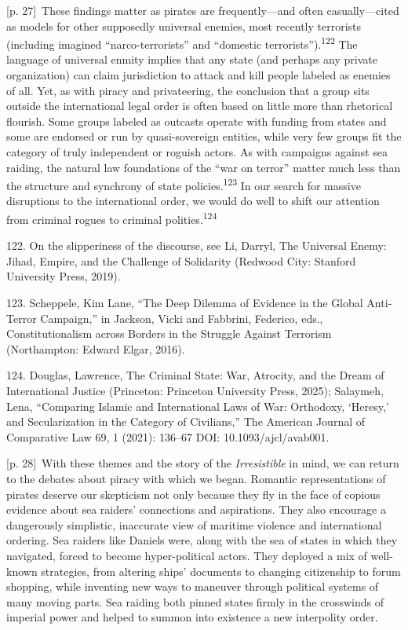 \documentclass[10pt,a4paper]{article}
\begin{document}
{\scriptsize\color{gray} [p. 27]}\ These findings matter as pirates are frequently—and often casually—cited as models for other supposedly universal enemies, most recently terrorists (including imagined “narco-terrorists” and “domestic terrorists”).\nobreak\textsuperscript{122} The language of universal enmity implies that any state (and perhaps any private organization) can claim jurisdiction to attack and kill people labeled as enemies of all. Yet, as with piracy and privateering, the conclusion that a group sits outside the international legal order is often based on little more than rhetorical flourish. Some groups labeled as outcasts operate with funding from states and some are endorsed or run by quasi-sovereign entities, while very few groups fit the category of truly independent or roguish actors. As with campaigns against sea raiding, the natural law foundations of the “war on terror” matter much less than the structure and synchrony of state policies.\nobreak\textsuperscript{123} In our search for massive disruptions to the international order, we would do well to shift our attention from criminal rogues to criminal polities.\nobreak\textsuperscript{124}\par{\small 122. On the slipperiness of the discourse, see Li, Darryl, The Universal Enemy: Jihad, Empire, and the Challenge of Solidarity (Redwood City: Stanford University Press, 2019).\par}{\small 123. Scheppele, Kim Lane, “The Deep Dilemma of Evidence in the Global Anti‐Terror Campaign,” in Jackson, Vicki and Fabbrini, Federico, eds., Constitutionalism across Borders in the Struggle Against Terrorism (Northampton: Edward Elgar, 2016).\par}{\small 124. Douglas, Lawrence, The Criminal State: War, Atrocity, and the Dream of International Justice (Princeton: Princeton University Press, 2025); Salaymeh, Lena, “Comparing Islamic and International Laws of War: Orthodoxy, ‘Heresy,’ and Secularization in the Category of Civilians,” The American Journal of Comparative Law 69, 1 (2021): 136–67 DOI: 10.1093/ajcl/avab001.\par}
{\scriptsize\color{gray} [p. 28]}\ With these themes and the story of the \textit{Irresistible} in mind, we can return to the debates about piracy with which we began. Romantic representations of pirates deserve our skepticism not only because they fly in the face of copious evidence about sea raiders’ connections and aspirations. They also encourage a dangerously simplistic, inaccurate view of maritime violence and international ordering. Sea raiders like Daniels were, along with the sea of states in which they navigated, forced to become hyper-political actors. They deployed a mix of well-known strategies, from altering ships’ documents to changing citizenship to forum shopping, while inventing new ways to maneuver through political systems of many moving parts. Sea raiding both pinned states firmly in the crosswinds of imperial power and helped to summon into existence a new interpolity order.\par
\end{document}

